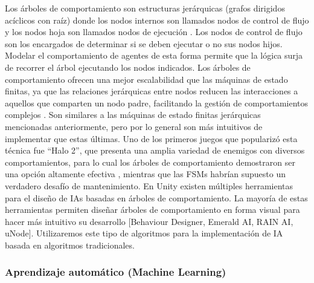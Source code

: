 \documentclass{article}
\begin{document}
Los árboles de comportamiento son estructuras jerárquicas (grafos dirigidos acíclicos con raíz) donde los nodos internos son llamados nodos de control de flujo y los nodos hoja son llamados nodos de ejecución \cite{behavior_tress_in_robotics_and_ai}. Los nodos de control de flujo son los encargados de determinar si se deben ejecutar o no sus nodos hijos. Modelar el comportamiento de agentes de esta forma permite que la lógica surja de recorrer el árbol ejecutando los nodos indicados. Los árboles de comportamiento ofrecen una mejor escalabilidad que las máquinas de estado finitas, ya que las relaciones jerárquicas entre nodos reducen las interacciones a aquellos que comparten un nodo padre, facilitando la gestión de comportamientos complejos \cite{behavior_tress_in_robotics_and_ai}. Son similares a las máquinas de estado finitas jerárquicas mencionadas anteriormente, pero por lo general son más intuitivos de implementar que estas últimas.
Uno de los primeros juegos que popularizó esta técnica fue “Halo 2”, que presenta una amplia  variedad de enemigos con diversos comportamientos, para lo cual los árboles de comportamiento demostraron ser una opción altamente efectiva \cite{implementation_of_behavior_tree_in_halo_2}, mientras que las FSMs habrían supuesto un verdadero desafío de mantenimiento.
En Unity existen múltiples herramientas para el diseño de IAs basadas en árboles de comportamiento. La mayoría de estas herramientas permiten diseñar árboles de comportamiento en forma visual para hacer más intuitivo su desarrollo [Behaviour Designer, Emerald AI, RAIN AI, uNode]. Utilizaremos este tipo de algoritmos para la implementación de IA basada en algoritmos tradicionales.

\subsubsection{Aprendizaje automático (Machine Learning)}
\end{document}
